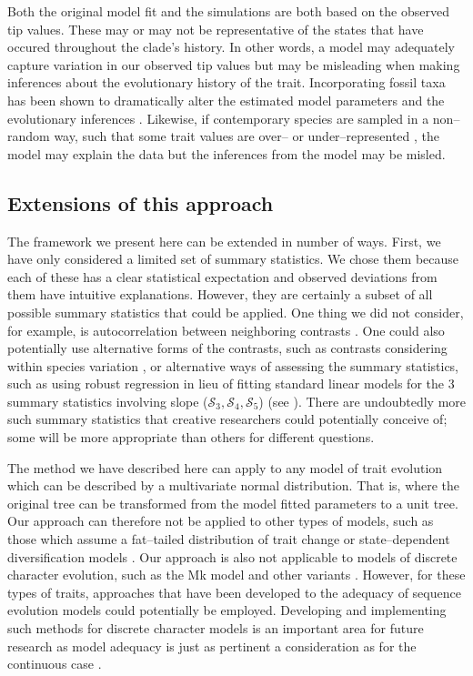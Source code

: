 \documentclass[a4paper,12pt]{article}
\begin{document}
Both the original model fit and the simulations are both based on the observed tip values. These may or may not be representative of the states that have occured throughout the clade's history. In other words, a model may adequately capture variation in our observed tip values but may be misleading when making inferences about the evolutionary history of the trait. Incorporating fossil taxa has been shown to dramatically alter the estimated model parameters and the evolutionary inferences \citep{FF2006, Slater2012Fossil, SlaterMEE}. Likewise, if contemporary species are sampled in a non--random way, such that some trait values are over-- or under--represented \citep{Freckletoninaction}, the model may explain the data but the inferences from the model may be misled. 

\subsection*{Extensions of this approach}
The framework we present here can be extended in number of ways. First, we have only considered a limited set of summary statistics. We chose them because each of these has a clear statistical expectation and observed deviations from them have intuitive explanations. However, they are certainly a subset of all possible summary statistics that could be applied. One thing we did not consider, for example, is autocorrelation between neighboring contrasts \citep{Gittleman1990}. One could also potentially use alternative forms of the contrasts, such as contrasts considering within species variation \citep{Felsenstein2008}, or alternative ways of assessing the summary statistics, such as using robust regression in lieu of fitting standard linear models for the 3 summary statistics involving slope ($\mathcal{S}_3, \mathcal{S}_4, \mathcal{S}_5$) (see \citep{SlaterPennell}). There are undoubtedly more such summary statistics that creative researchers could potentially conceive of; some will be more appropriate than others for different questions.

The method we have described here can apply to any model of trait evolution which can be described by a multivariate normal distribution. That is, where the original tree can be transformed from the model fitted parameters to a unit tree. Our approach can therefore not be applied to other types of models, such as those which assume a fat--tailed distribution of trait change \citep{Landis2012} or state--dependent diversification models \citep{Bokma2008, FitzJohn2010}. Our approach is also not applicable to models of discrete character evolution, such as the Mk model \citep{Pagel1994} and other variants \citep{Felsenstein2012, Beaulieu2013}. However, for these types of traits, approaches that have been developed to the adequacy of sequence evolution models \citep{Bollback2002, Lewis2013} could potentially be employed. Developing and implementing such methods for discrete character models is an important area for future research as model adequacy is just as pertinent a consideration as for the continuous case \citep{ReadNee1995}. 
\end{document}
